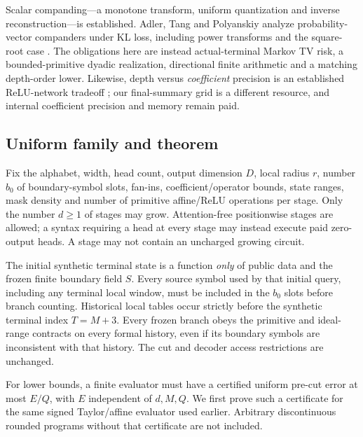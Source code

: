 \documentclass[11pt,letterpaper]{article}
\theoremstyle{definition}\newtheorem{definition}[theorem]{Definition}
\theoremstyle{remark}\newtheorem{remark}[theorem]{Remark}
\begin{document}
Scalar companding---a monotone transform, uniform quantization and inverse reconstruction---is established. Adler, Tang and Polyanskiy analyze probability-vector companders under KL loss, including power transforms and the square-root case \citep[Sections I--III, Theorem 5]{adler2022}. The obligations here are instead actual-terminal Markov TV risk, a bounded-primitive dyadic realization, directional finite arithmetic and a matching depth-order lower. Likewise, depth versus \emph{coefficient} precision is an established ReLU-network tradeoff \citep[Proposition 4.1]{ou2024}; our final-summary grid is a different resource, and internal coefficient precision and memory remain paid.

\subsection{Uniform family and theorem}
Fix the alphabet, width, head count, output dimension $D$, local radius $r$, number $b_0$ of boundary-symbol slots, fan-ins, coefficient/operator bounds, state ranges, mask density and number of primitive affine/ReLU operations per stage. Only the number $d\ge1$ of stages may grow. Attention-free positionwise stages are allowed; a syntax requiring a head at every stage may instead execute paid zero-output heads. A stage may not contain an uncharged growing circuit.

The initial synthetic terminal state is a function \emph{only} of public data and the frozen finite boundary field $S$. Every source symbol used by that initial query, including any terminal local window, must be included in the $b_0$ slots before branch counting. Historical local tables occur strictly before the synthetic terminal index $T=M+3$. Every frozen branch obeys the primitive and ideal-range contracts on every formal history, even if its boundary symbols are inconsistent with that history. The cut and decoder access restrictions are unchanged.

For lower bounds, a finite evaluator must have a certified uniform pre-cut error at most $E/Q$, with $E$ independent of $d,M,Q$. We first prove such a certificate for the same signed Taylor/affine evaluator used earlier. Arbitrary discontinuous rounded programs without that certificate are not included.
\end{document}
